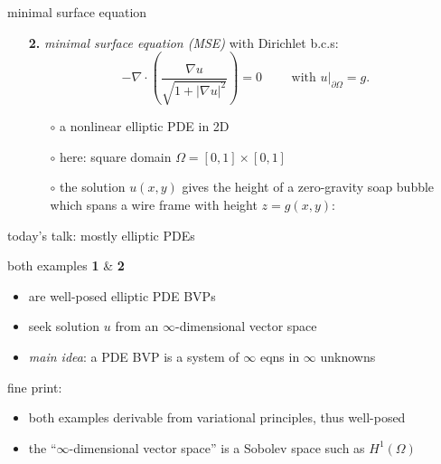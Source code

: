\documentclass[hide notes,intlimits,usenames,dvipsnames]{beamer}
\newcommand{\grad}{\nabla}
\begin{document}
\begin{frame}{minimal surface equation}

\begin{itemize}
\item[\textbf{2.}] \emph{minimal surface equation (MSE)} with Dirichlet b.c.s:
	    $$- \grad\cdot \left(\frac{\grad u}{\sqrt{1 + |\grad u|^2}}\right) = 0  \qquad \text{ with } u\big|_{\partial \Omega} = g.$$
    \vspace{-2mm}
	\begin{itemize}
	\item[$\circ$] a nonlinear elliptic PDE in 2D
	\item[$\circ$] here: square domain $\Omega = [0,1] \times [0,1]$
	\item[$\circ$] the solution $u(x,y)$ gives the height of a zero-gravity soap bubble which spans a wire frame with height $z=g(x,y)$:
	\end{itemize}

\begin{center}
\begin{tikzpicture}[scale=2.0]  \end{tikzpicture}
\end{center}
\end{itemize}
\end{frame}


\begin{frame}{today's talk: mostly elliptic PDEs}

both examples {\color{Blue} \textbf{1}} \& {\color{Blue} \textbf{2}}
\begin{itemize}
\item are well-posed elliptic PDE BVPs
\item seek solution $u$ from an \alert{$\infty$-dimensional vector space}
\item \emph{main idea}: a PDE BVP is a system of $\infty$ eqns in $\infty$ unknowns
\end{itemize}

\bigskip\bigskip\bigskip

\scriptsize
fine print:
\begin{itemize}
\item both examples derivable from variational principles, thus well-posed
\item the ``$\infty$-dimensional vector space'' is a Sobolev space such as $H^1(\Omega)$
\end{itemize}
\end{frame}
\end{document}
